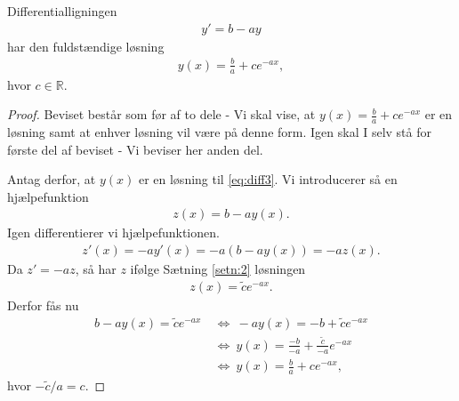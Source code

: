 \begin{setn}\label{setn:3}
	Differentialligningen
	\begin{align}\label{eq:diff3}
		y' = b - ay
	\end{align}
	har den fuldstændige løsning
	\begin{align*}
		y(x) = \frac{b}{a} + ce^{-ax},
	\end{align*}
	hvor $c \in \mathbb{R}$.
\end{setn}
\begin{proof}
	Beviset består som før af to dele - Vi skal vise, at $y(x) = \frac{b}{a} +ce^{-ax}$ er en løsning samt at enhver løsning vil være på denne form. Igen skal I selv stå for
	første del af beviset - Vi beviser her anden del.
	
	Antag derfor, at $y(x)$ er en løsning til \eqref{eq:diff3}. Vi introducerer så en hjælpefunktion
	\begin{align*}
		z(x) = b-ay(x). 
	\end{align*}
	Igen differentierer vi hjælpefunktionen. 
	\begin{align*}
		z'(x) = -ay'(x) = -a(b-ay(x)) =-az(x). 
	\end{align*}
	Da $z' = -az$, så har $z$ ifølge Sætning \ref{setn:2} løsningen
	\begin{align*}
		z(x) = \tilde{c}e^{-ax}. 
	\end{align*}
	Derfor fås nu
	\begin{align*}
		b-ay(x) = \tilde{c}e^{-ax} \ &\Leftrightarrow \ -ay(x) = -b+\tilde{c}e^{-ax}\\
		&\Leftrightarrow	\ y(x) = \frac{-b}{-a} + \frac{\tilde{c}}{-a}e^{-ax}\\
		&\Leftrightarrow \ y(x) = \frac{b}{a} + ce^{-ax},
	\end{align*}
	hvor $-\tilde{c}/a = c$. 
\end{proof}

